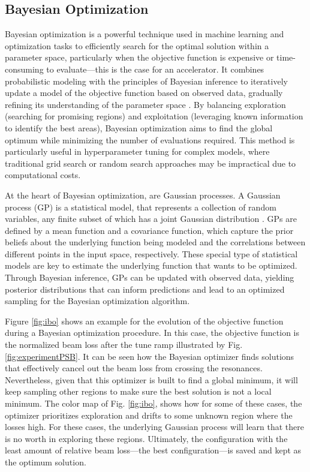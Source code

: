 \subsection{Bayesian Optimization}

Bayesian optimization is a powerful technique used in machine learning and optimization tasks to efficiently search for the optimal solution within a parameter space, particularly when the objective function is expensive or time-consuming to evaluate---this is the case for an accelerator. It combines probabilistic modeling with the principles of Bayesian inference to iteratively update a model of the objective function based on observed data, gradually refining its understanding of the parameter space \cite{bayesian}. By balancing exploration (searching for promising regions) and exploitation (leveraging known information to identify the best areas), Bayesian optimization aims to find the global optimum while minimizing the number of evaluations required. This method is particularly useful in hyperparameter tuning for complex models, where traditional grid search or random search approaches may be impractical due to computational costs.

At the heart of Bayesian optimization, are Gaussian processes. A Gaussian process (GP) is a statistical model, that represents a collection of random variables, any finite subset of which has a joint Gaussian distribution \cite{bayesian}. GPs are defined by a mean function and a covariance function, which capture the prior beliefs about the underlying function being modeled and the correlations between different points in the input space, respectively. These special type of statistical models are key to estimate the underlying function that wants to be optimized. Through Bayesian inference, GPs can be updated with observed data, yielding posterior distributions that can inform predictions and lead to an optimized sampling for the Bayesian optimization algorithm. 

Figure \ref{fig:ibo} shows an example for the evolution of the objective function during a Bayesian optimization procedure. In this case, the objective function is the normalized beam loss after the tune ramp illustrated by Fig. \ref{fig:experimentPSB}. It can be seen how the Bayesian optimizer finds solutions that effectively cancel out the beam loss from crossing the resonances. Nevertheless, given that this optimizer is built to find a global minimum, it will keep sampling other regions to make sure the best solution is not a local minimum. The color map of Fig. \ref{fig:ibo}, shows how for some of these cases, the optimizer prioritizes exploration and drifts to some unknown region where the losses high. For these cases, the underlying Gaussian process will learn that there is no worth in exploring these regions. Ultimately, the configuration with the least amount of relative beam loss---the best configuration---is saved and kept as the optimum solution.

